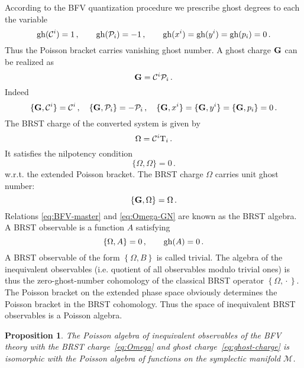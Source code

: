 \documentclass[a4paper,11pt,oneside]{amsart}
\theoremstyle{plain}
\numberwithin{equation}{section} %
\numberwithin{figure}{section} %
\newtheorem{fact}{Proposition}[section]
\newcommand{\pb}[2]{\left\{{}#1{},{}#2{}\right\}}
\newcommand{\gh}[1]{{\rm gh}(#1)}
\def\cP{{\mathcal P}}
\def\cc{{\mathcal C}}
\def\cT{{\rm T}}
\def\manM{{\mathcal M}}
\def\G{{ \bf G}}
\begin{document}
\noindent
According to the BFV quantization procedure
we prescribe ghost degrees to each the variable
\begin{equation}
\gh{\cc^i}=1\,, \qquad \gh{\cP_i}=-1\,, \qquad
\gh{x^i}=\gh{y^i}=\gh{p_i}=0\,.
\end{equation}
Thus the Poisson bracket carries vanishing ghost
number.  A ghost charge $\G$ can be realized as
\begin{equation}
  \label{eq:ghost-charge}
\G=\cc^i\cP_i  \,.
\end{equation}
Indeed
\begin{equation}
\{\G,\cc^i\}=\cc^i\,,\quad \{\G,\cP_i\}=-\cP_i\,, \quad
\{\G,x^i\}=\{\G,y^i\}=\{\G,p_i\}=0\,.
\end{equation}
The BRST charge of the converted system is given by
\begin{equation}
  \label{eq:Omega}
  \Omega=\cc^i \cT_i\,.
\end{equation}
It satisfies the nilpotency condition
\begin{equation}
\label{eq:BFV-master}
\{\Omega,\Omega\}=0\,.
\end{equation}
w.r.t. the extended Poisson bracket.  The BRST charge
$\Omega$ carries unit ghost number:
\begin{equation}
\label{eq:Omega-GN}
\pb{\G}{\Omega}=\Omega\,.
\end{equation}
Relations \eqref{eq:BFV-master} and \eqref{eq:Omega-GN}
are known as the BRST algebra.
A BRST observable is a function $A$ satisfying
\begin{equation}
\pb{\Omega}{A}=0\,, \qquad \gh{A}=0\,.
\end{equation}
A BRST observable of the form $\pb{\Omega}{B}$
is called trivial.  The algebra of the inequivalent observables
(i.e. quotient of all observables modulo trivial ones)
is thus the zero-ghost-number cohomology of the classical
BRST operator $\pb{\Omega}{\cdot}$.  The
Poisson bracket on the extended phase space
obviously determines the Poisson bracket in
the BRST cohomology.  Thus the space of inequivalent
BRST observables is a Poisson algebra.
\begin{fact}
The Poisson algebra of inequivalent observables of the
BFV theory with the BRST charge~\eqref{eq:Omega} and ghost
charge~\eqref{eq:ghost-charge} is isomorphic with the Poisson
algebra of functions on the symplectic manifold $\manM$.
\end{fact}
\end{document}
